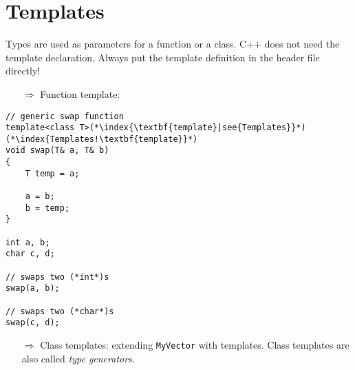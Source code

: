 \documentclass[10pt]{article}
\begin{document}
\section{Templates}
\small
Types are used as parameters for a function or a class.  C++ does not need the template declaration. Always put the 
template definition in the header file directly!
\begin{enumerate}
\item[$\Rightarrow$] Function template:
\end{enumerate}
\begin{lstlisting}
// generic swap function
template<class T>(*\index{\textbf{template}|see{Templates}}*)(*\index{Templates!\textbf{template}}*)
void swap(T& a, T& b)
{
    T temp = a;
    
    a = b;
    b = temp;
}

int a, b;
char c, d;

// swaps two (*int*)s
swap(a, b);

// swaps two (*char*)s
swap(c, d);
\end{lstlisting}
\begin{enumerate}
\item[$\Rightarrow$] Class templates: extending \texttt{MyVector} with templates. Class templates are also called \emph{type generators}.
\end{enumerate}
\end{document}

